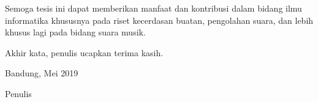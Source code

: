 Semoga tesis ini dapat memberikan manfaat dan kontribusi dalam bidang ilmu informatika khususnya pada riset kecerdasan buatan, pengolahan suara, dan lebih khusus lagi pada bidang suara musik.

Akhir kata, penulis ucapkan terima kasih.

\vspace{15mm}

Bandung, Mei 2019

Penulis